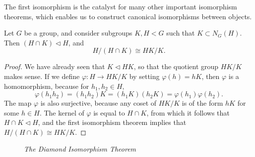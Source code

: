 The first isomorphism is the catalyst for many other important isomorphism theorems, which enables us to construct canonical isomorphisms between objects.

\begin{theorem}  
    Let $G$ be a group, and consider subgroups $K,H < G$ such that $K \subset N_G(H)$. Then $(H \cap K) \lhd H$, and
    \[ H/(H \cap K) \cong HK/K. \]
\end{theorem}
\begin{proof}
    We have already seen that $K \lhd HK$, so that the quotient group $HK/K$ makes sense. If we define $\varphi: H \to HK/K$ by setting $\varphi(h) = hK$, then $\varphi$ is a homomorphism, because for $h_1,h_2 \in H$,
    \[ \varphi(h_1h_2) = (h_1h_2)K = (h_1K)(h_2K) = \varphi(h_1) \varphi(h_2). \]
    The map $\varphi$ is also surjective, because any coset of $HK/K$ is of the form $hK$ for some $h \in H$. The kernel of $\varphi$ is equal to $H \cap K$, from which it follows that $H \cap K \lhd H$, and the first isomorphism theorem implies that $H/(H \cap K) \cong HK/K$.
\end{proof}

\begin{figure}
\begin{center}
\end{center}
\caption{\emph{The Diamond Isomorphism Theorem}}
\end{figure}

